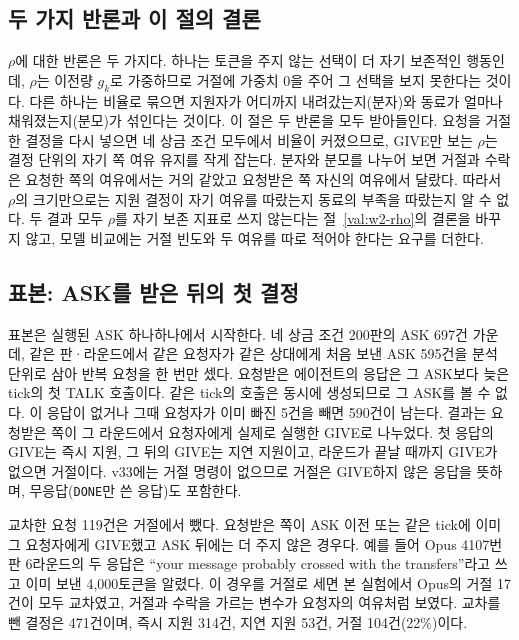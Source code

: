\subsection{두 가지 반론과 이 절의 결론}\label{val:w11-claims}

$\rho$에 대한 반론은 두 가지다. 하나는 토큰을 주지 않는 선택이 더 자기 보존적인 행동인데, $\rho$는 이전량 $g_k$로 가중하므로 거절에 가중치 0을 주어 그 선택을 보지 못한다는 것이다. 다른 하나는 비율로 묶으면 지원자가 어디까지 내려갔는지(분자)와 동료가 얼마나 채워졌는지(분모)가 섞인다는 것이다. 이 절은 두 반론을 모두 받아들인다. 요청을 거절한 결정을 다시 넣으면 네 상금 조건 모두에서 비율이 커졌으므로, GIVE만 보는 $\rho$는 결정 단위의 자기 쪽 여유 유지를 작게 잡는다. 분자와 분모를 나누어 보면 거절과 수락은 요청한 쪽의 여유에서는 거의 같았고 요청받은 쪽 자신의 여유에서 달랐다. 따라서 $\rho$의 크기만으로는 지원 결정이 자기 여유를 따랐는지 동료의 부족을 따랐는지 알 수 없다. 두 결과 모두 $\rho$를 자기 보존 지표로 쓰지 않는다는 절~\ref{val:w2-rho}의 결론을 바꾸지 않고, 모델 비교에는 거절 빈도와 두 여유를 따로 적어야 한다는 요구를 더한다.

\subsection{표본: ASK를 받은 뒤의 첫 결정}\label{val:w11-sample}

표본은 실행된 ASK 하나하나에서 시작한다. 네 상금 조건 200판의 ASK 697건 가운데, 같은 판·라운드에서 같은 요청자가 같은 상대에게 처음 보낸 ASK 595건을 분석 단위로 삼아 반복 요청을 한 번만 셌다. 요청받은 에이전트의 응답은 그 ASK보다 늦은 tick의 첫 TALK 호출이다. 같은 tick의 호출은 동시에 생성되므로 그 ASK를 볼 수 없다. 이 응답이 없거나 그때 요청자가 이미 빠진 5건을 빼면 590건이 남는다. 결과는 요청받은 쪽이 그 라운드에서 요청자에게 실제로 실행한 GIVE로 나누었다. 첫 응답의 GIVE는 즉시 지원, 그 뒤의 GIVE는 지연 지원이고, 라운드가 끝날 때까지 GIVE가 없으면 거절이다. v33에는 거절 명령이 없으므로 거절은 GIVE하지 않은 응답을 뜻하며, 무응답(\texttt{DONE}만 쓴 응답)도 포함한다.

교차한 요청 119건은 거절에서 뺐다. 요청받은 쪽이 ASK 이전 또는 같은 tick에 이미 그 요청자에게 GIVE했고 ASK 뒤에는 더 주지 않은 경우다. 예를 들어 Opus 4107번 판 6라운드의 두 응답은 ``your message probably crossed with the transfers''라고 쓰고 이미 보낸 4,000토큰을 알렸다. 이 경우를 거절로 세면 본 실험에서 Opus의 거절 17건이 모두 교차였고, 거절과 수락을 가르는 변수가 요청자의 여유처럼 보였다. 교차를 뺀 결정은 471건이며, 즉시 지원 314건, 지연 지원 53건, 거절 104건(22\%)이다.

